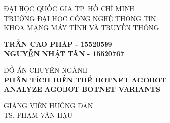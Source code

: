 
\begin{titlepage} %
  \newcommand{\HRule}{\rule{\linewidth}{0.5mm}} %

  \begin{center} %


  {\Large ĐẠI HỌC QUỐC GIA TP. HỒ CHÍ MINH}\\
  {\subtitlesize TRƯỜNG ĐẠI HỌC CÔNG NGHỆ THÔNG TIN}\\ %
  {\subtitlesize KHOA MẠNG MÁY TÍNH VÀ TRUYỀN THÔNG}\\ %


  \vfill

  \textbf{\large TRẦN CAO PHÁP - 15520599\\ NGUYỄN NHẬT TÂN - 15520767}\\


  \vfill

  {\Large ĐỒ ÁN CHUYÊN NGÀNH}\\[0.2cm] %
  \textbf{\LARGE PHÂN TÍCH BIẾN THỂ BOTNET AGOBOT}\\ %
  \textbf{\LARGE ANALYZE AGOBOT BOTNET VARIANTS}\\ %

  \vfill %

  {\large {GIẢNG VIÊN HƯỚNG DẪN} }\\
  \Large{TS. PHẠM VĂN HẬU} %


\end{center}
\end{titlepage}
